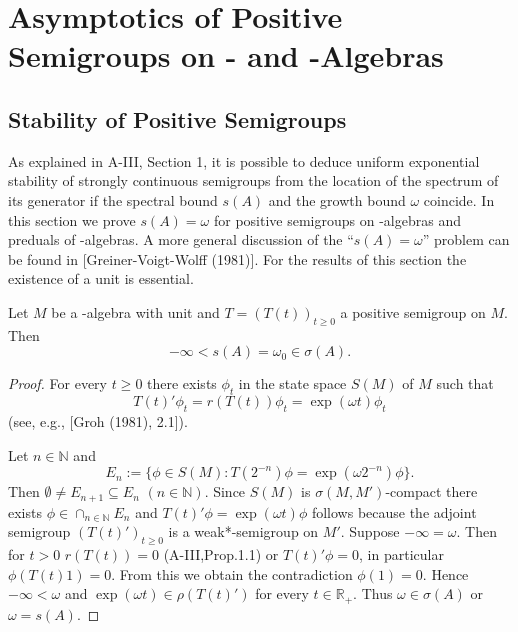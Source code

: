 

\chapter{Asymptotics of Positive Semigroups on \CA- and \WA-Algebras}\label{chap:D-IV}

\section{Stability of Positive Semigroups}\label{sec:d4-1}

As explained in A-III, Section 1, it is possible to deduce uniform exponential stability of strongly continuous semigroups from the location of the spectrum of its generator if the spectral bound $ s(A) $ and the growth bound $ \omega $ coincide.
In this section we prove $s(A) = \omega$ for positive semigroups on \CA-algebras and preduals of \WA-algebras.
A more general discussion of the \enquote{$s(A) = \omega$} problem can be found in [Greiner-Voigt-Wolff (1981)].
For the results of this section the existence of a unit is essential.
\begin{theorem}\label{thm:d4-1.1}
Let $M$ be a \CA-algebra with unit and $T = (T(t))_{t \geq 0}$ a positive semigroup on $M$.
Then
\[
	-\infty < s(A) = \omega_{0} \in \sigma(A).
\]
\end{theorem}
\begin{proof}
For every  $t \geq 0 $ there exists $\phi_{t}$ in the state space $S(M)$ of $M$ such that
\[
	T(t)'\phi_{t} = r(T(t))\phi_{t} = \exp(\omega t)\phi_{t}
\]
(see, e.g., [Groh (1981), 2.1]).

Let $n \in \mathbb{N}$ and
\[
E_{n} := \{\phi \in S(M) : T(2^{-n})\phi = \exp(\omega 2^{-n})\phi \}.
\]
Then $\emptyset \neq E_{n+1} \subseteq E_{n}$ $(n \in \mathbb{N})$.
Since $S(M)$ is $\sigma(M,M')$-compact there exists $\phi \in \cap_{n \in \mathbb{N}} E_{n}$ and $T(t)'\phi = \exp(\omega t)\phi$ follows because the adjoint semigroup $(T(t)')_{t \geq 0}$ is a weak*-semigroup on $M'$.
Suppose $-\infty = \omega$.
Then for $t > 0$ $r(T(t)) = 0$ (A-III,Prop.1.1) or $T(t)'\phi = 0$, in particular $\phi(T(t)1) = 0$.
From this we obtain the contradiction $\phi(1) = 0$.
Hence $-\infty < \omega$ and $\exp(\omega t) \in \rho(T(t)')$ for every $t \in \mathbb{R}_{+}$.
Thus $\omega \in \sigma(A)$ or $\omega = s(A)$.
\end{proof}

